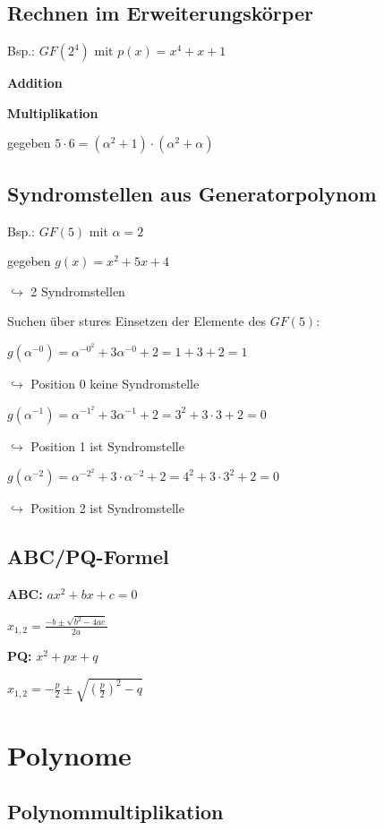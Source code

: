 \subsection{Rechnen im Erweiterungskörper}

Bsp.: $GF(2^4)$ mit $p(x) = x^4 + x + 1$

\textbf{Addition}

\textbf{Multiplikation}

gegeben $5 \cdot 6 = (\alpha^2 + 1) \cdot (\alpha^2 + \alpha)$

\subsection{Syndromstellen aus Generatorpolynom}

Bsp.: $GF(5)$ mit $\alpha = 2$

gegeben $g(x) = x^2 + 5x + 4$

$\hookrightarrow$ 2 Syndromstellen

Suchen über stures Einsetzen der Elemente des $GF(5)$:

$g(\alpha^{-0}) = \alpha^{-0^2} + 3\alpha^{-0} + 2 = 1 + 3 + 2 = 1$

$\hookrightarrow$ Position 0 keine Syndromstelle 

$g(\alpha^{-1}) = \alpha^{-1^2} + 3 \alpha^{-1} + 2 = 3^2 + 3 \cdot 3 + 2 = 0$

$\hookrightarrow$ Position 1 ist Syndromstelle

$g(\alpha^{-2}) = \alpha^{-2^2} + 3 \cdot \alpha^{-2} + 2 = 4^2 + 3 \cdot 3^2 + 2 = 0$

$\hookrightarrow$ Position 2 ist Syndromstelle

\subsection{ABC/PQ-Formel}

\textbf{ABC:} $ax^2 + bx + c = 0$

$\displaystyle{
    x_{1,2} = \frac{-b \pm \sqrt{ b^2 - 4ac }}{2a}
}$

\textbf{PQ:} $x^2 + px + q$

$\displaystyle{
    x_{1,2} = -\frac{p}{2} \pm \sqrt{\left(\frac{p}{2}\right)^2 - q}
}$

\section{Polynome}

\subsection{Polynommultiplikation}

